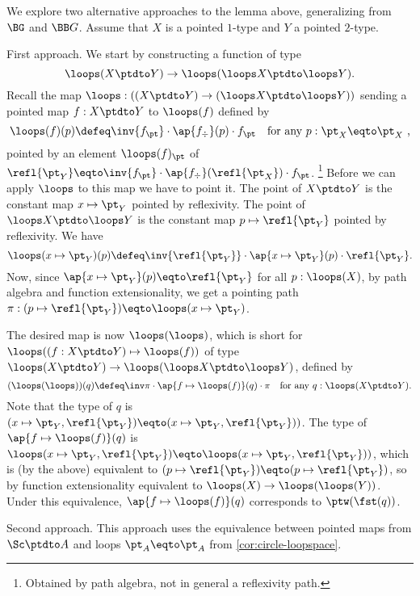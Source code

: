 \begin{remark}\label{rem:grpHomOK}
We explore two alternative approaches to the lemma above,
generalizing from $\BG$ and $\BB G$.
Assume that $X$ is a pointed $1$-type and $Y$ a
pointed $2$-type.

First approach. We start by constructing a function of type 
$$\loops(X\ptdto Y) \to \loops(\loops X\ptdto \loops Y).$$
Recall the map $\loops : ((X\ptdto Y)\to(\loops X\ptdto \loops Y))$
sending  a pointed map $f:X\ptdto Y$ to $\loops(f)$ defined by 
\[
\loops(f)(p) \defeq \inv{f_\pt}\cdot \ap{f_\div}(p) \cdot f_\pt
\quad\text{for any $p:\pt_X\eqto\pt_X $,}
\]
pointed by an element $\loops(f)_\pt$ of 
$\refl{\pt_Y} \eqto \inv{f_\pt}\cdot \ap{f_\div}(\refl{\pt_X}) \cdot f_\pt$.%
\footnote{
Obtained by path algebra, not in general a reflexivity path.}
Before we can apply ${\loops}$ to this map we have to point it.
The point of $X\ptdto Y$ is the constant 
map $x\mapsto\pt_Y$ pointed by reflexivity.
The point of $\loops X\ptdto \loops Y$ is the constant 
map $p\mapsto\refl{\pt_Y}$ pointed by reflexivity.
We have
\[
\loops(x\mapsto\pt_Y)(p) \defeq 
\inv{\refl{\pt_Y}}\cdot \ap{x\mapsto\pt_Y}(p) \cdot \refl{\pt_Y}.
\]
Now, since $\ap{x\mapsto\pt_Y}(p) \eqto \refl{\pt_Y}$ 
for all $p: \loops(X)$, by path algebra and function extensionality, 
we get a pointing path
$\pi: (p\mapsto \refl{\pt_Y})\eqto \loops(x\mapsto\pt_Y)$.

The desired map is now $\loops(\loops)$, which is short for
$\loops((f:X\ptdto Y) \mapsto \loops(f))$ of type $\loops(X\ptdto Y) \to \loops(\loops X\ptdto \loops Y)$, defined by
\[
(\loops(\loops))(q)\defeq\inv\pi\cdot\ap{f\mapsto\loops(f)}(q)\cdot\pi
\quad\text{for any $q:\loops(X\ptdto Y)$}.
\]
Note that the type of $q$ is 
$(x\mapsto\pt_Y,\refl{\pt_Y})\eqto(x\mapsto\pt_Y,\refl{\pt_Y}))$.
The type of $\ap{f\mapsto\loops(f)}(q)$ is
$\loops(x\mapsto\pt_Y,\refl{\pt_Y})\eqto\loops(x\mapsto\pt_Y,\refl{\pt_Y}))$,
which is (by the above) equivalent to 
$(p\mapsto \refl{\pt_Y})\eqto(p\mapsto \refl{\pt_Y})$,
so by function extensionality equivalent to 
$\loops(X)\to\loops(\loops(Y))$. Under this equivalence,
$\ap{f\mapsto\loops(f)}(q)$ corresponds to $\ptw(\fst(q))$. 

Second approach. This approach uses the equivalence
between pointed maps from $\Sc\ptdto A$ and loops $\pt_A\eqto\pt_A$
from \cref{cor:circle-loopspace}.


\end{remark}

